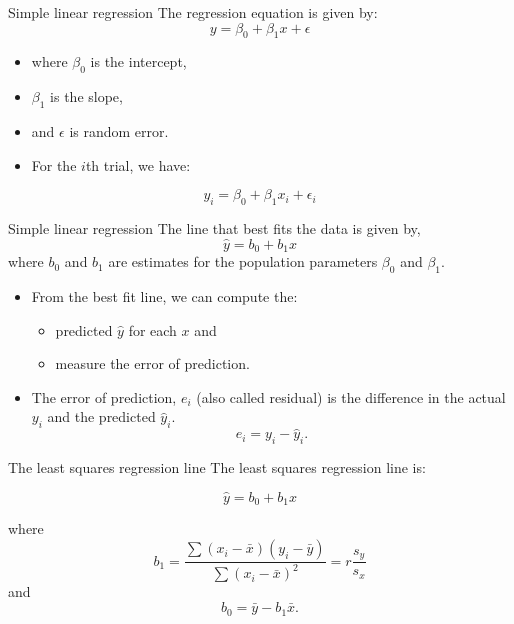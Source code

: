 \documentclass[
  ignorenonframetext,
]{beamer}
\providecommand{\tightlist}{%
  \setlength{\itemsep}{0pt}\setlength{\parskip}{0pt}}
\begin{document}
\begin{frame}{Simple linear regression}
\protect{}\label{simple-linear-regression-2}
The regression equation is given by: \[y=\beta_0+\beta_1x+\epsilon\]

\begin{itemize}
\item
  where \(\beta_0\) is the intercept,
\item
  \(\beta_1\) is the slope,
\item
  and \(\epsilon\) is random error.
\item
  For the \(i\)th trial, we have:
\end{itemize}

\[y_i=\beta_0+\beta_1x_i+\epsilon_i\]
\end{frame}

\begin{frame}{Simple linear regression}
\protect{}\label{simple-linear-regression-3}
The line that best fits the data is given by, \[\hat{y}=b_0+b_1x\] where
\(b_0\) and \(b_1\) are estimates for the population parameters
\(\beta_0\) and \(\beta_1\).

\begin{itemize}
\item
  From the best fit line, we can compute the:

  \begin{itemize}
  \tightlist
  \item
    predicted \(\hat{y}\) for each \(x\) and
  \item
    measure the error of prediction.
  \end{itemize}
\item
  The error of prediction, \(e_i\) (also called residual) is the
  difference in the actual \(y_i\) and the predicted \(\hat{y}_i\).
  \[e_i=y_i-\hat{y}_i.\]
\end{itemize}
\end{frame}

\begin{frame}{The least squares regression line}
\protect{}\label{the-least-squares-regression-line}
The least squares regression line is:

\[\hat{y}=b_0+b_1x\]

where
\[b_1=\frac{\sum(x_i-\bar{x})(y_i-\bar{y})}{\sum(x_i-\bar{x})^2}=r \frac{s_y}{s_x}\]
and \[b_0=\bar{y}-b_1\bar{x}.\]
\end{frame}
\end{document}
